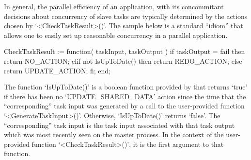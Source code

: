 In  general,  the  parallel  efficiency  of  an  application,  with   its
concommitant decisions about concurrency of  slave  tasks  are  typically
determined by the actions chosen  by  `<CheckTaskResult>()'.  The  sample
below is a standard {\ParGAP} ``idiom'' that allows one to easily set  up
reasonable concurrency in a parallel application.

\beginexample
CheckTaskResult := function( taskInput, taskOutput )
  if taskOutput = fail then return NO_ACTION;
  elif not IsUpToDate() then return REDO_ACTION;
  else return UPDATE_ACTION;
  fi;
end;
\endexample

The function `IsUpToDate()' is a boolean function provided  by  {\ParGAP}
that returns `true' if there  has  been  no  `UPDATE_SHARED_DATA'  action
since the time that the ``corresponding'' task input was generated  by  a
call to the user-provided  function  `<GenerateTaskInput>()'.  Otherwise,
`IsUpToDate()' returns `false'. The ``corresponding'' task input  is  the
task input associated with that task output which was most recently  seen
on the master process. In  the  context  of  the  user-provided  function
`<CheckTaskResult>()', it is the first argument to that function.

